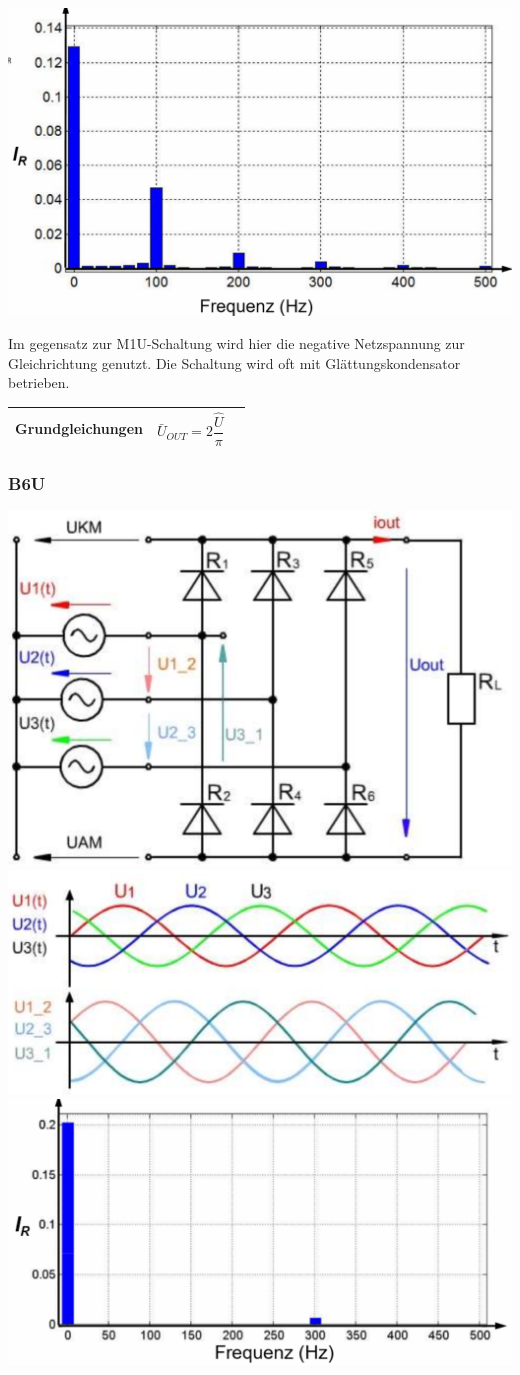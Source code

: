 \begin{minipage}{0.35\linewidth}
    \includegraphics[width=\linewidth]{images/UGB2OW}
\end{minipage}\newline

Im gegensatz zur M1U-Schaltung wird hier die negative Netzspannung zur Gleichrichtung genutzt.\newline
Die Schaltung wird oft mit Glättungskondensator betrieben.
\begin{longtable}{| p{} | p{} | p{} |} %
    \hline
    \textbf{Grundgleichungen}&
    \[ \bar{U}_{OUT} = 2\dfrac{\hat{U}}{\pi}\]&\\
    \hline   
\end{longtable}


\subsubsection{B6U}
\includegraphics[width=0.3\linewidth]{images/PrakUGB6}
\includegraphics[width=0.3\linewidth]{images/PrakUGB6Kl1}
\includegraphics[width=0.3\linewidth]{images/UGB6OW}\newline
\clearpage
